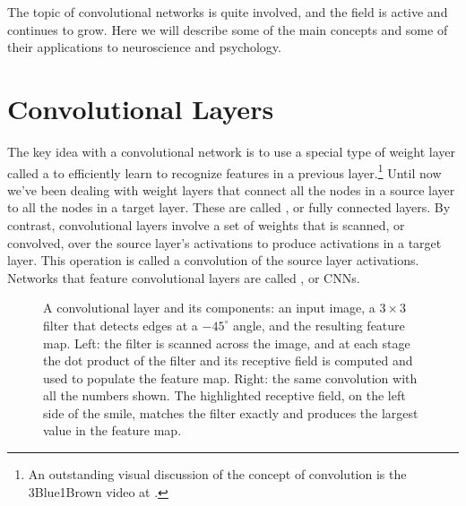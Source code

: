 The topic of convolutional networks is quite involved, and the field is active and continues to grow. Here we will describe some of the main concepts and some of their applications to neuroscience and psychology.

\section{Convolutional Layers}\label{convolutionalLayer}


The key idea with a convolutional network is to use a special type of weight layer called a  to efficiently learn to recognize features in a previous layer.\footnote{An outstanding visual discussion of the concept of convolution is the 3Blue1Brown video at .} Until now we've been dealing with weight layers that connect all the nodes in a source layer to all the nodes in a target layer. These are called , or fully connected layers. By contrast, convolutional layers involve a set of weights that is scanned, or convolved, over the source layer's activations to produce activations in a target layer. This operation is called a convolution of the source layer activations. Networks that feature convolutional layers are called , or CNNs.

\begin{figure}[h]
\centering
{}
\caption[Jeff Yoshimi, after an image by Soraya Boza adapting one by User Cecbur, .]{A convolutional layer and its components: an input image, a $3 \times 3$ filter that detects edges at a $-45^\circ$ angle, and the resulting feature map. Left: the filter is scanned across the image, and at each stage the dot product of the filter and its receptive field is computed and used to populate the feature map. Right: the same convolution with all the numbers shown. The highlighted receptive field, on the left side of the smile, matches the filter exactly and produces the largest value in the feature map.}
\label{cnn_filter}
\end{figure}


